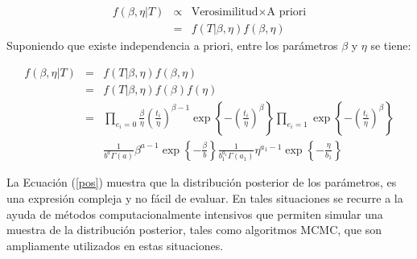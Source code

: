 \begin{eqnarray*}
f(\beta,\eta|T)&\propto&\mbox{Verosimilitud} \times \mbox{A priori} \\
&=& f(T|\beta,\eta)f(\beta,\eta)
\end{eqnarray*}
Suponiendo que existe independencia a priori, entre los par\'ametros $\beta$ y $\eta$ se tiene:

\begin{eqnarray}\label{pos}
f(\beta,\eta|T)&=&f(T|\beta,\eta)f(\beta,\eta)\\\nonumber
&=& f(T|\beta,\eta)f(\beta)f(\eta)\\\nonumber
&=& \prod_{e_i=0}\frac{\beta}{\eta}\left(\frac{t_i}{\eta}\right)^{\beta-1}\exp \left\{-\left(\frac{t_i}{\eta}\right)^{\beta}\right\}\prod_{e_i=1}\exp\left\{-\left(\frac{t_i}{\eta}\right)^{\beta}\right\}\\\nonumber
& &\frac{1}{b^a\Gamma(a)}\beta^{a-1}\exp\left\{-\frac{\beta}{b}\right\}\frac{1}{b_1^{a_1}\Gamma(a_1)}\eta^{a_1-1}\exp\left\{-\frac{\eta}{b_1}\right\}
\end{eqnarray}

\noindent La Ecuaci\'on (\ref{pos}) muestra que la distribuci\'on posterior de los par\'ametros, es una expresi\'on compleja y no f\'acil de evaluar.  En tales situaciones se recurre a la ayuda de m\'etodos computacionalmente intensivos que permiten simular una muestra de la distribuci\'on posterior, tales como algoritmos MCMC, que son ampliamente
utilizados en estas situaciones.

